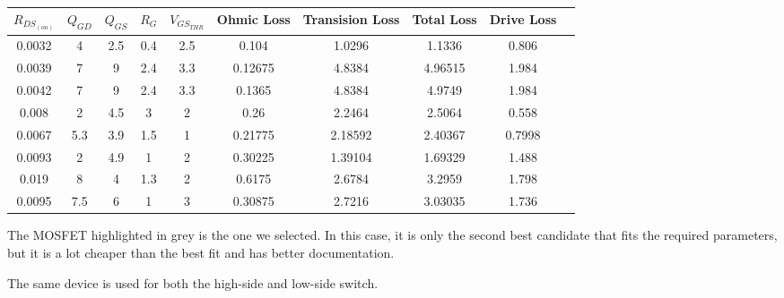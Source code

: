 \begin{table}[th!]
    \begin{center}
        \caption{}
        \label{tab:circuit:buck:mosfet}
        \begin{tabular}{cccccccccc}
            \toprule
            $R_{DS_{(on)}}$ & $Q_{GD}$ & $Q_{GS}$ & $R_G$ & $V_{GS_{THR}}$ & Ohmic Loss & Transision Loss & Total Loss & Drive Loss \\
            \midrule
            0.0032          & 4        & 2.5      & 0.4   & 2.5            & 0.104      & 1.0296          & 1.1336     & 0.806 \\
            0.0039          & 7        & 9        & 2.4   & 3.3            & 0.12675    & 4.8384          & 4.96515    & 1.984 \\
            0.0042          & 7        & 9        & 2.4   & 3.3            & 0.1365     & 4.8384          & 4.9749     & 1.984 \\
            0.008           & 2        & 4.5      & 3     & 2              & 0.26       & 2.2464          & 2.5064     & 0.558 \\
            0.0067          & 5.3      & 3.9      & 1.5   & 1              & 0.21775    & 2.18592         & 2.40367    & 0.7998 \\
            \rowcolor{lightgray}
            0.0093          & 2        & 4.9      & 1     & 2              & 0.30225    & 1.39104         & 1.69329    & 1.488 \\
            0.019           & 8        & 4        & 1.3   & 2              & 0.6175     & 2.6784          & 3.2959     & 1.798 \\
            0.0095          & 7.5      & 6        & 1     & 3              & 0.30875    & 2.7216          & 3.03035    & 1.736 \\
            \bottomrule
        \end{tabular}
    \end{center}
\end{table}

The MOSFET highlighted in grey is the one we selected. In  this case, it is only
the second best candidate that fits the required parameters, but  it  is  a  lot
cheaper than the best fit and has better documentation.

The same device is used for both the high-side and low-side switch.

